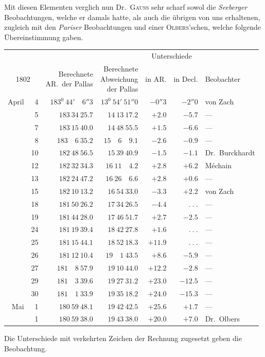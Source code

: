Mit diesen Elementen verglich nun Dr.\ \textsc{Gauss} sehr scharf sowol die \textit{Seeberger} Beobachtungen, welche er damals hatte, als auch die übrigen von uns erhaltenen, zugleich mit den \textit{Pariser} Beobachtungen und einer \textsc{Olbers}'schen, welche folgende Übereinstimmung gaben.
\begin{center}
{\small\setlength{\tabcolsep}{3pt}
\begin{tabular}{r r|r|r|r|r|l}
\multicolumn{2}{c|}{}&&&\multicolumn{2}{c|}{Unterschiede}&\\
\multicolumn{2}{c|}{1802}&\shortstack{Berechnete\\AR.\ der Pallas}&\shortstack{Berechnete\\Abweichung\\der Pallas}&in AR.&in Decl.&Beobachter\\\hline
April&4&$183^0\ 44'\quad6''3$&$13^0\ 54'\ 51''0$&$-0''3$&$-2''0$&von Zach\\
&5&$183\ 34\ 25.7$&$14\ 13\ 17.2$&$+2.0$&$-5.7$&—\\
&7&$183\ 15\ 40.0$&$14\ 48\ 55.5$&$+1.5$&$-6.6$&—\\
&8&$183\quad6\ 35.2$&$15\quad6\quad9.1$&$-2.6$&$-0.9$&—\\
&10&$182\ 48\ 56.5$&$15\ 39\ 40.9$&$-1.5$&$-1.1$&Dr.\ Burckhardt\\
&12&$182\ 32\ 34.3$&$16\ 11\quad4.2$&$+2.8$&$+6.2$&Méchain\\
&13&$182\ 24\ 47.2$&$16\ 26\quad6.6$&$+2.8$&$+0.6$&—\\
&15&$182\ 10\ 13.2$&$16\ 54\ 33.0$&$-3.3$&$+2.2$&von Zach\\
&18&$181\ 50\ 26.2$&$17\ 34\ 26.5$&$-4.4$&$\ .\ .\ .$&—\\
&19&$181\ 44\ 28.0$&$17\ 46\ 51.7$&$+2.7$&$-2.5$&—\\
&24&$181\ 19\ 39.4$&$18\ 42\ 27.8$&$+1.6$&$\ .\ .\ .$&—\\
&25&$181\ 15\ 44.1$&$18\ 52\ 18.3$&$+11.9$&$\ .\ .\ .$&—\\
&26&$181\ 12\ 10.4$&$19\quad1\ 43.5$&$+8.6$&$-5.9$&—\\
&27&$181\quad8\ 57.9$&$19\ 10\ 44.0$&$+12.2$&$-2.8$&—\\
&29&$181\quad3\ 39.6$&$19\ 27\ 31.2$&$+23.0$&$-12.5$&—\\
&30&$181\quad1\ 33.9$&$19\ 35\ 18.2$&$+24.0$&$-15.3$&—\\
Mai&1&$180\ 59\ 48.1$&$19\ 42\ 42.5$&$+25.6$&$+1.7$&—\\
&1&$180\ 59\ 38.0$&$19\ 43\ 38.0$&$+20.0$&$+7.0$&Dr.\ Olbers
\end{tabular}}
\end{center}
Die Unterschiede mit verkehrten Zeichen der Rechnung zugesetzt geben die Beobachtung.

